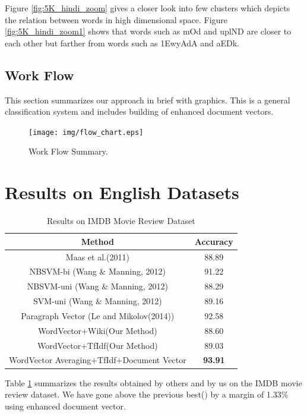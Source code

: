 \documentclass[11pt,a4paper]{article}
\begin{document}
Figure \ref{fig:5K_hindi_zoom} gives a closer look into few clusters which depicts the relation between words in high dimensional space. Figure \ref{fig:5K_hindi_zoom1} shows that words such as 
{\dn mOd} and {\dn uplND} are closer to each other but farther from words such as {\dn \31EwyAdA} and {\dn aEDk}.

\subsection{Work Flow}
This section summarizes our approach in brief with graphics. This is a general classification system and includes building of enhanced document vectors.
\begin{figure}[H]
\centering
\texttt{[image: img/flow\_chart.eps]}
\caption{Work Flow Summary. \label{fig:flow_chart}}
\end{figure}

\section{Results on English Datasets}

\begin {table}[H]
\centering
\small
\begin{tabular}{ | c | c | }
\hline
\textbf{Method} & \textbf{Accuracy} \\ \hline
Maas et al.(2011) & 88.89\\ \hline
NBSVM-bi (Wang \& Manning, 2012) & 91.22\\ \hline
NBSVM-uni (Wang \& Manning, 2012) & 88.29\\ \hline
SVM-uni (Wang \& Manning, 2012) & 89.16\\ \hline
Paragraph Vector (Le and Mikolov(2014)) & 92.58\\ \hline
WordVector+Wiki(Our Method) & 88.60\\ \hline
WordVector+TfIdf(Our Method) & 89.03\\ \hline
WordVector Averaging+TfIdf+Document Vector & \textbf{93.91}\\ \hline

\end{tabular}
\caption {Results on IMDB Movie Review Dataset}
\label{table:IMDB}
\end{table}

Table \ref{table:IMDB} summarizes the results obtained by others and by us on the IMDB movie review dataset. We have gone above the previous best(\cite{Le:14}) by a margin of 1.33\% using enhanced document vector.
\end{document}
